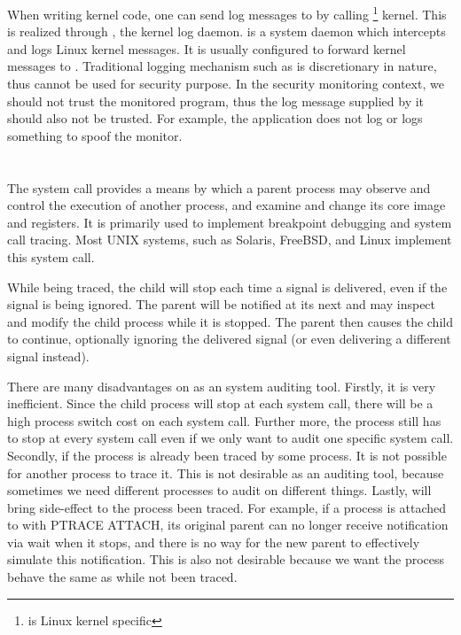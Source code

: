 When writing kernel code, one can send log messages to  by calling
\footnote{ is Linux kernel specific} kernel.  This is
realized through , the kernel log daemon.   is a system
daemon which intercepts and logs Linux kernel messages. It is usually
configured to forward kernel messages to . Traditional logging
mechanism such as  is discretionary in nature, thus cannot be used
for security purpose. In the security monitoring context, we should not trust
the monitored program, thus the log message supplied by it should also not be
trusted. For example, the application does not log or logs something to spoof
the monitor.

\section{}

The  system call provides a means by which a parent process may
observe and control the execution of another process, and examine and change
its core image and registers. It is primarily used to implement breakpoint
debugging and system call tracing. Most UNIX systems, such as Solaris, FreeBSD,
and Linux implement this system call.

While being traced, the child will stop
each time a signal is delivered, even if the signal is being ignored. The
parent will be notified at its next  and may inspect and modify the
child process while it is stopped. The parent then causes the child to
continue, optionally ignoring the delivered signal (or even delivering a
different signal instead).

There are many disadvantages on  as an system
auditing tool. Firstly, it is very inefficient. Since the child process will
stop at each system call, there will be a high process switch cost on each
system call. Further more, the process still has to stop at every system call
even if we only want to audit one specific system call. Secondly, if the
process is already been traced by some process. It is not possible for another
process to trace it. This is not desirable as an auditing tool, because
sometimes we need different processes to audit on different things. Lastly,
 will bring side-effect to the process been traced. For example, if a
process is attached to with PTRACE ATTACH, its original parent can no longer
receive notification via wait when it stops, and there is no way for the new
parent to effectively simulate this notification. This is also not desirable
because we want the process behave the same as while not been traced.

